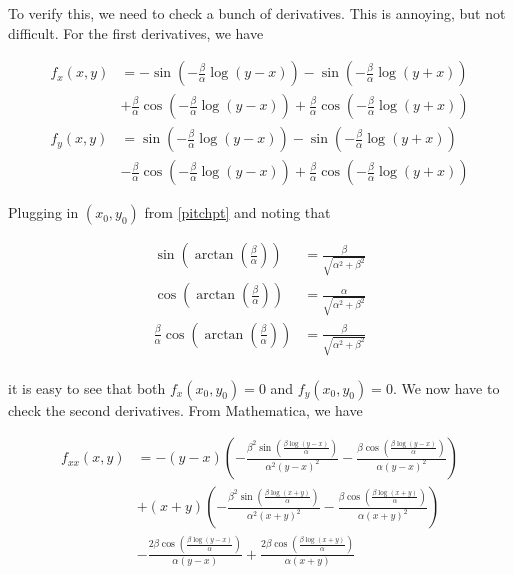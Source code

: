 \documentclass[12pt]{article}
\begin{document}
\begin{enumerate}
To verify this, we need to check a bunch of derivatives. This is annoying, but not difficult. For the first derivatives, we have

\begin{align*}
f_x(x, y) &= -\sin \left( - \frac{\beta}{\alpha} \log(y - x) \right) - 
\sin \left( - \frac{\beta}{\alpha} \log(y + x) \right) \\
&+\frac{\beta}{\alpha} \cos \left( - \frac{\beta}{\alpha} \log(y - x) \right) + \frac{\beta}{\alpha} \cos \left( - \frac{\beta}{\alpha} \log(y + x) \right) \\
f_y(x, y) &= \sin \left( - \frac{\beta}{\alpha} \log(y - x) \right) - 
\sin \left( - \frac{\beta}{\alpha} \log(y + x) \right) \\
&-\frac{\beta}{\alpha} \cos \left( - \frac{\beta}{\alpha} \log(y - x) \right) + \frac{\beta}{\alpha} \cos \left( - \frac{\beta}{\alpha} \log(y + x) \right)
\end{align*}

Plugging in $(x_0, y_0)$ from \eqref{pitchpt} and noting that

\begin{align*}
\sin \left( \arctan \left( \frac{\beta}{\alpha}\right) \right) &=
\frac{\beta}{\sqrt{\alpha^2 + \beta^2}} \\
\cos \left( \arctan \left( \frac{\beta}{\alpha}\right) \right) &=
\frac{\alpha}{\sqrt{\alpha^2 + \beta^2}} \\
\frac{\beta}{\alpha} \cos \left( \arctan \left( \frac{\beta}{\alpha}\right) \right) &=
\frac{\beta}{\sqrt{\alpha^2 + \beta^2}} \\
\end{align*}

it is easy to see that both $f_x(x_0, y_0) = 0$ and $f_y(x_0, y_0) = 0$. We now have to check the second derivatives. From Mathematica, we have

\begin{align*}
f_{xx}(x, y) &= -(y-x) \left(-\frac{\beta^2 \sin \left(\frac{\beta \log (y-x)}{\alpha}\right)}{\alpha^2 (y-x)^2}-\frac{\beta
   \cos \left(\frac{\beta \log (y-x)}{\alpha}\right)}{\alpha (y-x)^2}\right)\\
   &+(x+y) \left(-\frac{\beta^2
   \sin \left(\frac{\beta \log (x+y)}{\alpha}\right)}{\alpha^2 (x+y)^2}-\frac{\beta \cos \left(\frac{\beta
   \log (x+y)}{\alpha}\right)}{\alpha (x+y)^2}\right)\\
   &-\frac{2 \beta \cos \left(\frac{\beta \log
   (y-x)}{\alpha}\right)}{\alpha (y-x)}+\frac{2 \beta \cos \left(\frac{\beta \log (x+y)}{\alpha}\right)}{\alpha
   (x+y)}
\end{align*}


\end{enumerate}
\end{document}
